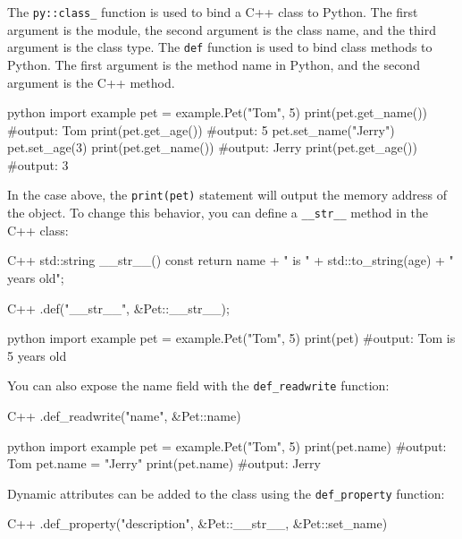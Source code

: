The \texttt{py::class\_} function is used to bind a C++ class to Python. The first argument is the module, the second argument is the class name, and the third argument is the class type. The \texttt{def} function is used to bind class methods to Python. The first argument is the method name in Python, and the second argument is the C++ method.

\begin{neonlisting}{python}
import example
pet = example.Pet("Tom", 5)
print(pet.get_name()) #output: Tom
print(pet.get_age()) #output: 5
pet.set_name("Jerry")
pet.set_age(3)
print(pet.get_name()) #output: Jerry
print(pet.get_age()) #output: 3
\end{neonlisting}

In the case above, the \texttt{print(pet)} statement will output the memory address of the object. To change this behavior, you can define a \texttt{\_\_str\_\_} method in the C++ class:

\begin{neonlisting}[language=C++]{C++}
std::string __str__() const {
    return name + " is " + std::to_string(age) + " years old";
}
\end{neonlisting}

\begin{neonlisting}[language=C++]{C++}
.def("__str__", &Pet::__str__);
\end{neonlisting}

\begin{neonlisting}{python}
import example
pet = example.Pet("Tom", 5)
print(pet) #output: Tom is 5 years old
\end{neonlisting}

You can also expose the name field with the \texttt{def\_readwrite} function:

\begin{neonlisting}[language=C++]{C++}
.def_readwrite("name", &Pet::name)
\end{neonlisting}

\begin{neonlisting}{python}
import example
pet = example.Pet("Tom", 5)
print(pet.name) #output: Tom
pet.name = "Jerry"
print(pet.name) #output: Jerry
\end{neonlisting}

Dynamic attributes can be added to the class using the \texttt{def\_property} function:

\begin{neonlisting}[language=C++]{C++}
.def_property("description", &Pet::__str__, &Pet::set_name)
\end{neonlisting}


